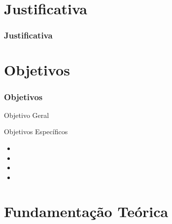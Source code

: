 \documentclass{beamer}
\begin{document}
\section{Justificativa}
\begin{frame}
\tableofcontents[ 
    currentsubsection, 
    hideothersubsections, 
    sectionstyle=show/shaded
    ] 
\end{frame}
\begin{frame}
\frametitle{Justificativa}
\begin{itemize}

\end{itemize}

\end{frame}

\section{Objetivos}
\begin{frame}
\tableofcontents[ 
    currentsubsection, 
    hideothersubsections, 
    sectionstyle=show/shaded
    ] 
\end{frame}
\begin{frame}
\frametitle{Objetivos}
\large
\begin{block}{Objetivo Geral}

\end{block}
\pause
\begin{block}{Objetivos Específicos}
\begin{itemize}
\item 
\item 
\item 
\item 
\end{itemize}

\end{block}

\end{frame}


\section{Fundamentação Teórica}
\begin{frame}
\tableofcontents[ 
    currentsubsection, 
    hideothersubsections, 
    sectionstyle=show/shaded
    ] 
\end{frame}
\end{document}
